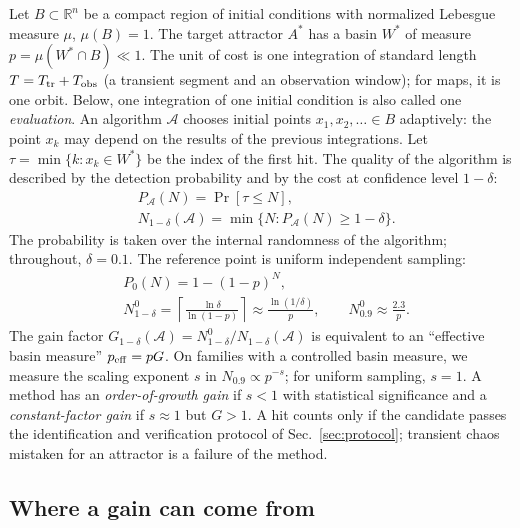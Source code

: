 Let $B\subset\mathbb{R}^n$ be a compact region of initial conditions with normalized Lebesgue measure $\mu$, $\mu(B)=1$. The target attractor $A^*$ has a basin $W^*$ of measure $p=\mu(W^*\cap B)\ll1$. The unit of cost is one integration of standard length $T=T_{\rm tr}+T_{\rm obs}$ (a transient segment and an observation window); for maps, it is one orbit. Below, one integration of one initial condition is also called one \emph{evaluation}. An algorithm $\mathcal{A}$ chooses initial points $x_1,x_2,\dots\in B$ adaptively: the point $x_k$ may depend on the results of the previous integrations. Let $\tau=\min\{k: x_k\in W^*\}$ be the index of the first hit. The quality of the algorithm is described by the detection probability and by the cost at confidence level $1-\delta$:
\begin{equation}
\begin{split}
&P_{\mathcal A}(N)=\Pr[\tau\le N],\\
&N_{1-\delta}(\mathcal A)=\min\{N: P_{\mathcal A}(N)\ge 1-\delta\}.
\end{split}
\label{eq:pn}
\end{equation}
The probability is taken over the internal randomness of the algorithm; throughout, $\delta=0.1$. The reference point is uniform independent sampling:
\begin{equation}
\begin{split}
&P_0(N)=1-(1-p)^N,\\
&N^0_{1-\delta}=\left\lceil\frac{\ln\delta}{\ln(1-p)}\right\rceil\approx\frac{\ln(1/\delta)}{p},\qquad N^0_{0.9}\approx\frac{2.3}{p}.
\end{split}
\label{eq:uniform}
\end{equation}
The gain factor $G_{1-\delta}(\mathcal A)=N^0_{1-\delta}/N_{1-\delta}(\mathcal A)$ is equivalent to an ``effective basin measure'' $p_{\rm eff}=pG$. On families with a controlled basin measure, we measure the scaling exponent $s$ in $N_{0.9}\propto p^{-s}$; for uniform sampling, $s=1$. A method has an \emph{order-of-growth gain} if $s<1$ with statistical significance and a \emph{constant-factor gain} if $s\approx1$ but $G>1$. A hit counts only if the candidate passes the identification and verification protocol of Sec.~\ref{sec:protocol}; transient chaos mistaken for an attractor is a failure of the method.

\subsection{Where a gain can come from}\label{sec:channels}

